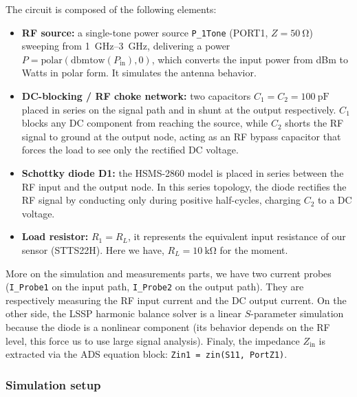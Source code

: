 The circuit is composed of the following elements:

\begin{itemize}
    \item \textbf{RF source:} a single-tone power source \texttt{P\_1Tone}
          (PORT1, $Z = \SI{50}{\ohm}$) sweeping from \SIrange{1}{3}{\giga\hertz},
          delivering a power $P = \mathrm{polar}(\mathrm{dbmtow}(P_\mathrm{in}), 0)$,
          which converts the input power from dBm to Watts in polar form. It simulates the antenna behavior. 

    \item \textbf{DC-blocking / RF choke network:} two capacitors
      $C_1 = C_2 = \SI{100}{\pico\farad}$ placed in series on the 
      signal path and in shunt at the output respectively.
      $C_1$ blocks any DC component from reaching the source, while 
      $C_2$ shorts the RF signal to ground at the output node, acting 
      as an RF bypass capacitor that forces the load to see only the 
      rectified DC voltage.

    \item \textbf{Schottky diode D1:} the HSMS-2860 model is placed in series between the
          RF input and the output node.
          In this series topology, the diode rectifies the RF signal by conducting
          only during positive half-cycles, charging $C_2$ to a DC voltage.

    \item \textbf{Load resistor:} $R_1 = R_L$, it represents the equivalent
          input resistance of our sensor (STTS22H).
          Here we have, $R_L = \SI{10}{\kilo\ohm}$ for the moment.
\end{itemize}

More on the simulation and measurements parts, we have two current probes (\texttt{I\_Probe1} on the input path, \texttt{I\_Probe2}
on the output path). They are respectively measuring the RF input current and the DC output current. On the other side, 
the LSSP harmonic balance solver is a linear $S$-parameter
simulation because the diode is a nonlinear component (its behavior
depends on the RF level, this force us to use large signal analysis). Finaly, the impedance $Z_\mathrm{in}$ is extracted via the ADS equation block:
\texttt{Zin1 = zin(S11, PortZ1)}.



\subsubsection{Simulation setup}

